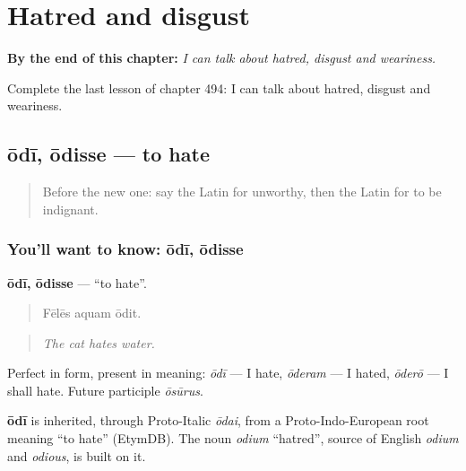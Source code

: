 
\chapter{Hatred and disgust}
\label{ch:la-hatred-and-disgust}

\begin{chapteropening}
\textbf{By the end of this chapter:} \emph{I can talk about hatred, disgust and weariness.}

Complete the last lesson of chapter 494: I can talk about hatred, disgust and weariness.
\end{chapteropening}

\section[ōdī, ōdisse]{ōdī, ōdisse — to hate}

\label{lesson:LA-C494-odi}



\begin{quote}
Before the new one: say the Latin for unworthy, then the Latin for to be indignant.
\end{quote}

\subsection*{You'll want to know: ōdī, ōdisse}
\textbf{ōdī, ōdisse} — \textquotedblleft{}to hate\textquotedblright{}.

\begin{quote}
Fēlēs aquam ōdit.
\end{quote}

\begin{quote}
\emph{The cat hates water.}
\end{quote}

Perfect in form, present in meaning: \emph{ōdī} — I hate, \emph{ōderam} — I hated, \emph{ōderō} — I shall hate. Future participle \emph{ōsūrus}.

\begin{cousinweb}
\textbf{ōdī} is inherited, through Proto-Italic \emph{ōdai}, from a Proto-Indo-European root meaning \textquotedblleft{}to hate\textquotedblright{} (EtymDB). The noun \emph{odium} \textquotedblleft{}hatred\textquotedblright{}, source of English \emph{odium} and \emph{odious}, is built on it.
\end{cousinweb}

